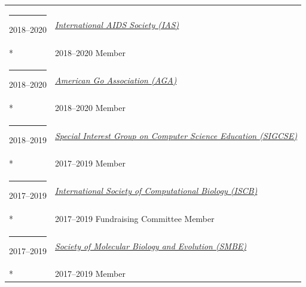 \documentclass[margin,line]{res}
\begin{document}
\begin{resume}
\begin{longtable}{@{}p{0.7in}p{4in}}
\hspace*{-4mm} \rule{-1mm}{5mm} 2018--2020 & \href{https://www.iasociety.org/}{\textit{International AIDS Society (IAS)}}\\*
\hspace*{-4mm} & \hspace{4mm} 2018--2020 Member\\
\hspace*{-4mm} \rule{-1mm}{5mm} 2018--2020 & \href{http://www.usgo.org/}{\textit{American Go Association (AGA)}}\\*
\hspace*{-4mm} & \hspace{4mm} 2018--2020 Member\\
\hspace*{-4mm} \rule{-1mm}{5mm} 2018--2019 & \href{https://sigcse.org/}{\textit{Special Interest Group on Computer Science Education (SIGCSE)}}\\*
\hspace*{-4mm} & \hspace{4mm} 2017--2019 Member\\
\hspace*{-4mm} \rule{-1mm}{5mm} 2017--2019 & \href{https://www.iscb.org/}{\textit{International Society of Computational Biology (ISCB)}}\\*
\hspace*{-4mm} & \hspace{4mm} 2017--2019 Fundraising Committee Member\\
\hspace*{-4mm} \rule{-1mm}{5mm} 2017--2019 & \href{http://www.smbe.org/}{\textit{Society of Molecular Biology and Evolution (SMBE)}}\\*
\hspace*{-4mm} & \hspace{4mm} 2017--2019 Member\\
\end{longtable}


\end{resume}
\end{document}
